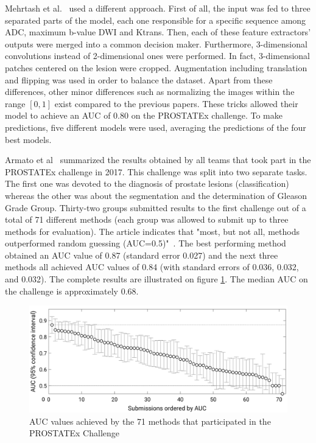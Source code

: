 Mehrtash et al.~\cite{01} used a different approach. First of all, the input was fed to three separated parts of the model, each one responsible for a specific sequence among ADC, maximum b-value DWI and Ktrans. Then, each of these feature extractors' outputs were merged into a common decision maker. Furthermore, 3-dimensional convolutions instead of 2-dimensional ones were performed. In fact, 3-dimensional patches centered on the lesion were cropped. Augmentation including translation and flipping was used in order to balance the dataset. Apart from these differences, other minor differences such as normalizing the images within the range $[0,1]$ exist compared to the previous papers. These tricks allowed their model to achieve an AUC of $0.80$ on the PROSTATEx challenge. To make predictions, five different models were used, averaging the predictions of the four best models.

Armato et al~\cite{42} summarized the results obtained by all teams that took part in the PROSTATEx challenge in 2017. This challenge was split into two separate tasks. The first one was devoted to the diagnosis of prostate lesions (classification) whereas the other was about the segmentation and the determination of Gleason Grade Group. Thirty-two groups submitted results to the first challenge out of a total of 71 different methods (each group was allowed to submit up to three methods for evaluation). The article indicates that "most, but not all, methods outperformed random guessing (AUC=0.5)"~\cite{41}. The best performing method obtained an AUC value of 0.87 (standard error 0.027) and the next three methods all achieved AUC values of 0.84 (with standard errors of 0.036, 0.032, and 0.032). The complete results are illustrated on figure \ref{fig:challenge_all_results}. The median AUC on the challenge is approximately $0.68$.
\begin{figure}[!h]
\centering
\includegraphics[width=1\textwidth, keepaspectratio=true]{./figures/challenge_all_results.png}
\caption{AUC values achieved by the 71 methods that participated in the PROSTATEx Challenge~\cite{42}}
\label{fig:challenge_all_results}
\end{figure}


